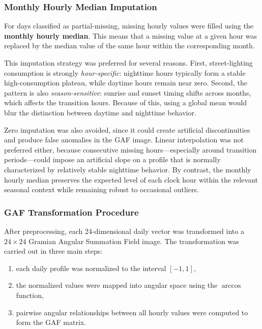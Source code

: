 \documentclass{article}
\begin{document}
\subsubsection{Monthly Hourly Median Imputation}

For days classified as partial-missing, missing hourly values were filled using the \textbf{monthly hourly median}. This means that a missing value at a given hour was replaced by the median value of the same hour within the corresponding month.

This imputation strategy was preferred for several reasons. First, street-lighting consumption is strongly \emph{hour-specific}: nighttime hours typically form a stable high-consumption plateau, while daytime hours remain near zero. Second, the pattern is also \emph{season-sensitive}: sunrise and sunset timing shifts across months, which affects the transition hours. Because of this, using a global mean would blur the distinction between daytime and nighttime behavior.

Zero imputation was also avoided, since it could create artificial discontinuities and produce false anomalies in the GAF image. Linear interpolation was not preferred either, because consecutive missing hours---especially around transition periods---could impose an artificial slope on a profile that is normally characterized by relatively stable nighttime behavior. By contrast, the monthly hourly median preserves the expected level of each clock hour within the relevant seasonal context while remaining robust to occasional outliers.

\subsubsection{GAF Transformation Procedure}

After preprocessing, each 24-dimensional daily vector was transformed into a $24 \times 24$ Gramian Angular Summation Field image. The transformation was carried out in three main steps:

\begin{enumerate}
    \item each daily profile was normalized to the interval $[-1,1]$,
    \item the normalized values were mapped into angular space using the $\arccos$ function,
    \item pairwise angular relationships between all hourly values were computed to form the GAF matrix.
\end{enumerate}
\end{document}
